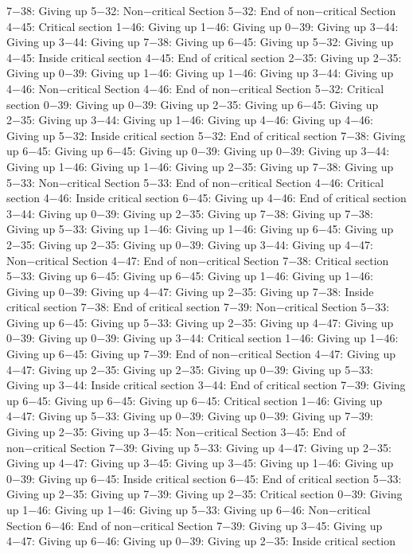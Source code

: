 7−38: Giving up
5−32: Non−critical Section
5−32: End of non−critical Section
4−45: Critical section
1−46: Giving up
1−46: Giving up
0−39: Giving up
3−44: Giving up
3−44: Giving up
7−38: Giving up
6−45: Giving up
5−32: Giving up
4−45: Inside critical section
4−45: End of critical section
2−35: Giving up
2−35: Giving up
0−39: Giving up
1−46: Giving up
1−46: Giving up
3−44: Giving up
4−46: Non−critical Section
4−46: End of non−critical Section
5−32: Critical section
0−39: Giving up
0−39: Giving up
2−35: Giving up
6−45: Giving up
2−35: Giving up
3−44: Giving up
1−46: Giving up
4−46: Giving up
4−46: Giving up
5−32: Inside critical section
5−32: End of critical section
7−38: Giving up
6−45: Giving up
6−45: Giving up
0−39: Giving up
0−39: Giving up
3−44: Giving up
1−46: Giving up
1−46: Giving up
2−35: Giving up
7−38: Giving up
5−33: Non−critical Section
5−33: End of non−critical Section
4−46: Critical section
4−46: Inside critical section
6−45: Giving up
4−46: End of critical section
3−44: Giving up
0−39: Giving up
2−35: Giving up
7−38: Giving up
7−38: Giving up
5−33: Giving up
1−46: Giving up
1−46: Giving up
6−45: Giving up
2−35: Giving up
2−35: Giving up
0−39: Giving up
3−44: Giving up
4−47: Non−critical Section
4−47: End of non−critical Section
7−38: Critical section
5−33: Giving up
6−45: Giving up
6−45: Giving up
1−46: Giving up
1−46: Giving up
0−39: Giving up
4−47: Giving up
2−35: Giving up
7−38: Inside critical section
7−38: End of critical section
7−39: Non−critical Section
5−33: Giving up
6−45: Giving up
5−33: Giving up
2−35: Giving up
4−47: Giving up
0−39: Giving up
0−39: Giving up
3−44: Critical section
1−46: Giving up
1−46: Giving up
6−45: Giving up
7−39: End of non−critical Section
4−47: Giving up
4−47: Giving up
2−35: Giving up
2−35: Giving up
0−39: Giving up
5−33: Giving up
3−44: Inside critical section
3−44: End of critical section
7−39: Giving up
6−45: Giving up
6−45: Giving up
6−45: Critical section
1−46: Giving up
4−47: Giving up
5−33: Giving up
0−39: Giving up
0−39: Giving up
7−39: Giving up
2−35: Giving up
3−45: Non−critical Section
3−45: End of non−critical Section
7−39: Giving up
5−33: Giving up
4−47: Giving up
2−35: Giving up
4−47: Giving up
3−45: Giving up
3−45: Giving up
1−46: Giving up
0−39: Giving up
6−45: Inside critical section
6−45: End of critical section
5−33: Giving up
2−35: Giving up
7−39: Giving up
2−35: Critical section
0−39: Giving up
1−46: Giving up
1−46: Giving up
5−33: Giving up
6−46: Non−critical Section
6−46: End of non−critical Section
7−39: Giving up
3−45: Giving up
4−47: Giving up
6−46: Giving up
0−39: Giving up
2−35: Inside critical section
